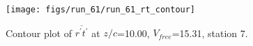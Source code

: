 \begin{figure}[H]
\centering
\texttt{[image: figs/run\_61/run\_61\_rt\_contour]}
\caption{Contour plot of $\overline{r^\prime t^\prime}$ at $z/c$=10.00, $V_{free}$=15.31, station 7.}
\label{fig:run_61_rt_contour}
\end{figure}


